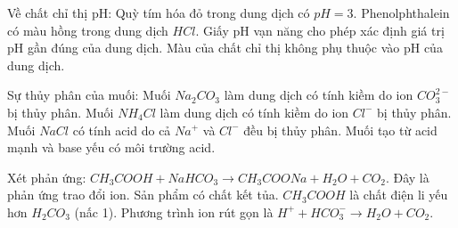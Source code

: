 \begin{ex}
	Về chất chỉ thị pH:
	\choiceTF
	{\True Quỳ tím hóa đỏ trong dung dịch có $pH = 3$.}
	{Phenolphthalein có màu hồng trong dung dịch $HCl$.}
	{\True Giấy pH vạn năng cho phép xác định giá trị pH gần đúng của dung dịch.}
	{Màu của chất chỉ thị không phụ thuộc vào pH của dung dịch.}
\end{ex}
\begin{ex}
	Sự thủy phân của muối:
	\choiceTF
	{\True Muối $Na_2CO_3$ làm dung dịch có tính kiềm do ion $CO_3^{2-}$ bị thủy phân.}
	{Muối $NH_4Cl$ làm dung dịch có tính kiềm do ion $Cl^-$ bị thủy phân.}
	{Muối $NaCl$ có tính acid do cả $Na^+$ và $Cl^-$ đều bị thủy phân.}
	{\True Muối tạo từ acid mạnh và base yếu có môi trường acid.}
\end{ex}
\begin{ex}
	Xét phản ứng: $CH_3COOH + NaHCO_3 \rightarrow CH_3COONa + H_2O + CO_2$.
	\choiceTF
	{\True Đây là phản ứng trao đổi ion.}
	{Sản phẩm có chất kết tủa.}
	{\True $CH_3COOH$ là chất điện li yếu hơn $H_2CO_3$ (nấc 1).} %
	{Phương trình ion rút gọn là $H^+ + HCO_3^- \rightarrow H_2O + CO_2$.}
\end{ex}
